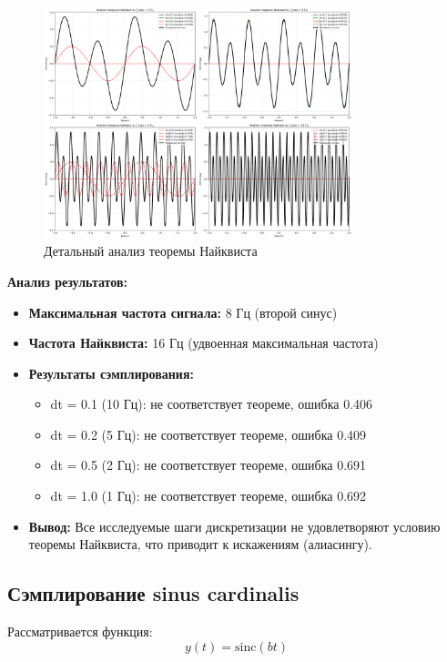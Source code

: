\begin{figure}[H]
    \centering
    \includegraphics[width=0.8\textwidth]{images/task2/nyquist_analysis.png}
    \caption{Детальный анализ теоремы Найквиста}
    \label{fig:nyquist_analysis}
\end{figure}

\textbf{Анализ результатов:}
\begin{itemize}
    \item \textbf{Максимальная частота сигнала:} 8 Гц (второй синус)
    \item \textbf{Частота Найквиста:} 16 Гц (удвоенная максимальная частота)
    \item \textbf{Результаты сэмплирования:}
    \begin{itemize}
        \item dt = 0.1 (10 Гц): не соответствует теореме, ошибка 0.406
        \item dt = 0.2 (5 Гц): не соответствует теореме, ошибка 0.409
        \item dt = 0.5 (2 Гц): не соответствует теореме, ошибка 0.691
        \item dt = 1.0 (1 Гц): не соответствует теореме, ошибка 0.692
    \end{itemize}
    \item \textbf{Вывод:} Все исследуемые шаги дискретизации не удовлетворяют условию теоремы Найквиста, что приводит к искажениям (алиасингу).
\end{itemize}

\subsection*{Сэмплирование sinus cardinalis}

Рассматривается функция:
\begin{equation}
y(t) = \text{sinc}(bt)
\end{equation}

